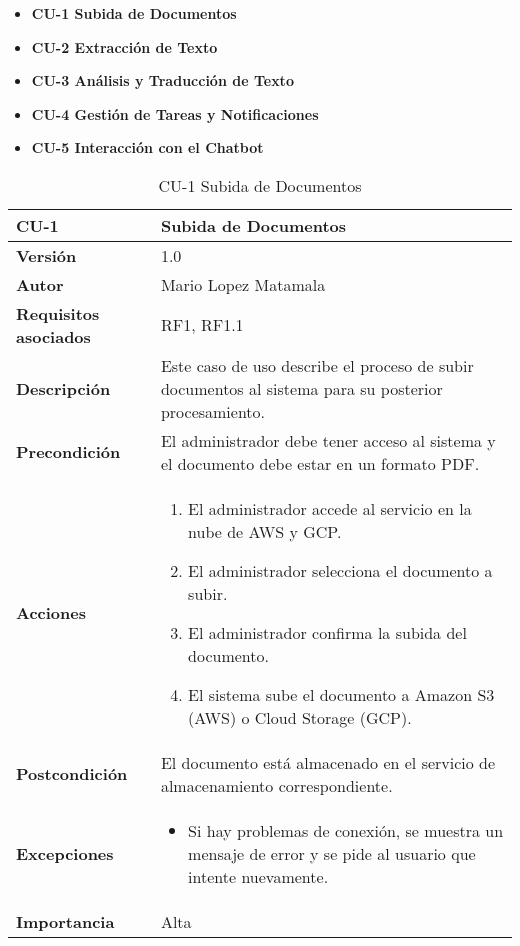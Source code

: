 \begin{itemize}
    \item \textbf{CU-1 Subida de Documentos}
    \item \textbf{CU-2 Extracción de Texto}
    \item \textbf{CU-3 Análisis y Traducción de Texto}
    \item \textbf{CU-4 Gestión de Tareas y Notificaciones}
    \item \textbf{CU-5 Interacción con el Chatbot}
\end{itemize}

\begin{table}[p]
\centering
\begin{tabularx}{\linewidth}{ p{} p{} }
\toprule
\textbf{CU-1} & \textbf{Subida de Documentos} \\
\toprule
\textbf{Versión} & 1.0 \\
\textbf{Autor} & Mario Lopez Matamala \\
\textbf{Requisitos asociados} & RF1, RF1.1 \\
\textbf{Descripción} & Este caso de uso describe el proceso de subir documentos al sistema para su posterior procesamiento. \\
\textbf{Precondición} & El administrador debe tener acceso al sistema y el documento debe estar en un formato PDF. \\
\textbf{Acciones} &
\begin{enumerate}
\def\labelenumi{\arabic{enumi}.}
\tightlist
\item El administrador accede al servicio en la nube de AWS y GCP.
\item El administrador selecciona el documento a subir.
\item El administrador confirma la subida del documento.
\item El sistema sube el documento a Amazon S3 (AWS) o Cloud Storage (GCP).
\end{enumerate} \\
\textbf{Postcondición} & El documento está almacenado en el servicio de almacenamiento correspondiente. \\
\textbf{Excepciones} &
\begin{itemize}
\item Si hay problemas de conexión, se muestra un mensaje de error y se pide al usuario que intente nuevamente.
\end{itemize} \\
\textbf{Importancia} & Alta \\
\bottomrule
\end{tabularx}
\caption{CU-1 Subida de Documentos}
\label{tab:cu1}
\end{table}

